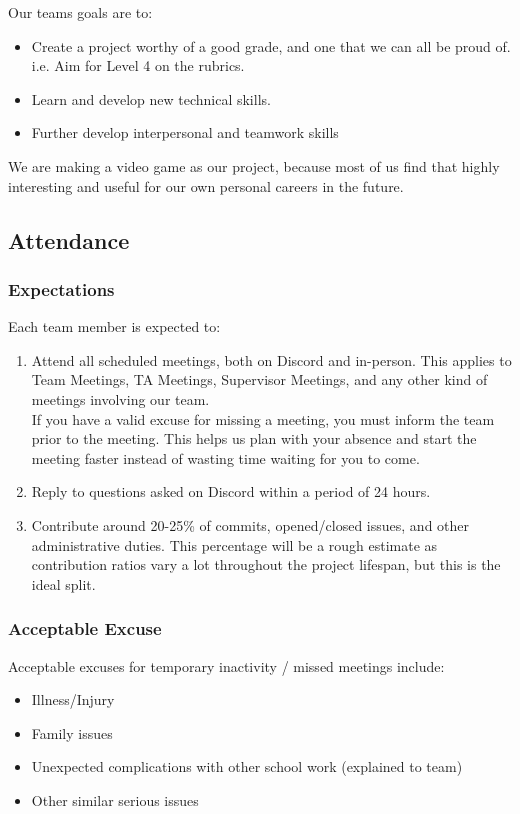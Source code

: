 \documentclass{article}
\begin{document}
Our teams goals are to:
\begin{itemize}
\item{Create a project worthy of a good grade, and one that we can all be proud of. i.e. Aim for Level 4 on the rubrics.}
\item{Learn and develop new technical skills.}
\item{Further develop interpersonal and teamwork skills}
\end{itemize}

We are making a video game as our project, because most of us find that highly interesting and useful for our own personal careers in the future.\\

\subsection*{Attendance}

\subsubsection*{Expectations}

Each team member is expected to:
\begin{enumerate}
\item{Attend all scheduled meetings, both on Discord and in-person. This applies to Team Meetings, TA Meetings, Supervisor Meetings, and any other kind of meetings involving our team.\\ If you have a valid excuse for missing a meeting, you must inform the team prior to the meeting. This helps us plan with your absence and start the meeting faster instead of wasting time waiting for you to come.}
\item{Reply to questions asked on Discord within a period of 24 hours.}
\item{Contribute around 20-25\% of commits, opened/closed issues, and other administrative duties. This percentage will be a rough estimate as contribution ratios vary a lot throughout the project lifespan, but this is the ideal split.}
\end{enumerate}

\subsubsection*{Acceptable Excuse}

Acceptable excuses for temporary inactivity / missed meetings include:
\begin{itemize}
\item{Illness/Injury}
\item{Family issues}
\item{Unexpected complications with other school work (explained to team)}
\item{Other similar serious issues}
\end{itemize}
\end{document}

